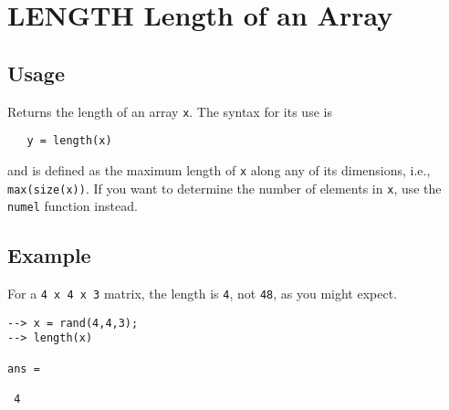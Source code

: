 \section{LENGTH Length of an Array}

\subsection{Usage}

Returns the length of an array \verb|x|.  The syntax for its use
is 
\begin{verbatim}
   y = length(x)
\end{verbatim}
and is defined as the maximum length of \verb|x| along any of its
dimensions, i.e., \verb|max(size(x))|.  If you want to determine the
number of elements in \verb|x|, use the \verb|numel| function instead.
\subsection{Example}

For a \verb|4 x 4 x 3| matrix, the length is \verb|4|, not \verb|48|, as you 
might expect.
\begin{verbatim}
--> x = rand(4,4,3);
--> length(x)

ans = 

 4 
\end{verbatim}
